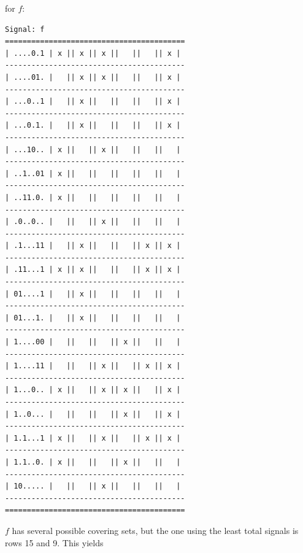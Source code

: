 \documentclass{article}
\begin{document}
\begin{enumerate}
            for $f$:
            \begin{scriptsize}
            \begin{verbatim}
Signal: f
=========================================
| ....0.1 | x || x || x ||   ||   || x |
-----------------------------------------
| ....01. |   || x || x ||   ||   || x |
-----------------------------------------
| ...0..1 |   || x ||   ||   ||   || x |
-----------------------------------------
| ...0.1. |   || x ||   ||   ||   || x |
-----------------------------------------
| ...10.. | x ||   || x ||   ||   ||   |
-----------------------------------------
| ..1..01 | x ||   ||   ||   ||   ||   |
-----------------------------------------
| ..11.0. | x ||   ||   ||   ||   ||   |
-----------------------------------------
| .0..0.. |   ||   || x ||   ||   ||   |
-----------------------------------------
| .1...11 |   || x ||   ||   || x || x |
-----------------------------------------
| .11...1 | x || x ||   ||   || x || x |
-----------------------------------------
| 01....1 |   || x ||   ||   ||   ||   |
-----------------------------------------
| 01...1. |   || x ||   ||   ||   ||   |
-----------------------------------------
| 1....00 |   ||   ||   || x ||   ||   |
-----------------------------------------
| 1....11 |   ||   || x ||   || x || x |
-----------------------------------------
| 1...0.. | x ||   || x || x ||   || x |
-----------------------------------------
| 1..0... |   ||   ||   || x ||   || x |
-----------------------------------------
| 1.1...1 | x ||   || x ||   || x || x |
-----------------------------------------
| 1.1..0. | x ||   ||   || x ||   ||   |
-----------------------------------------
| 10..... |   ||   || x ||   ||   ||   |
-----------------------------------------
=========================================
            \end{verbatim}
            \end{scriptsize}

            $f$ has several possible covering sets, but the one using the least 
            total signals is rows 15 and 9. This yields
            \pagebreak


\end{enumerate}
\end{document}
